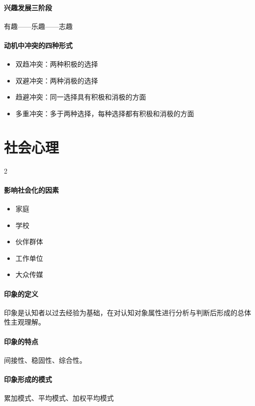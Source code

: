 \documentclass[b5paper,11pt]{article}
\begin{document}
\paragraph{兴趣发展三阶段} \textcolor{ctp-peach}{有趣——乐趣——志趣}

\paragraph{动机中冲突的四种形式}
\begin{itemize}
  \item 双趋冲突：两种积极的选择
  \item 双避冲突：两种消极的选择
  \item 趋避冲突：同一选择具有积极和消极的方面
  \item 多重冲突：多于两种选择，每种选择都有积极和消极的方面
\end{itemize}

\psplit

\section{社会心理}
\begingroup
{}
\setlength{\columnsep}{1em}
\begin{paracol}{2}
  \paragraph{影响社会化的因素}
  \begin{itemize}
    \item 家庭
    \item 学校
    \item 伙伴群体
    \item 工作单位
    \item 大众传媒
  \end{itemize}

  \switchcolumn

  \paragraph{印象的定义} 印象是认知者以过去经验为基础，在对认知对象属性进行分析与判断后形成的总体性主观理解。
  \paragraph{印象的特点} 间接性、稳固性、综合性。
  \paragraph{印象形成的模式} 累加模式、平均模式、加权平均模式

\end{paracol}
\endgroup
\end{document}
